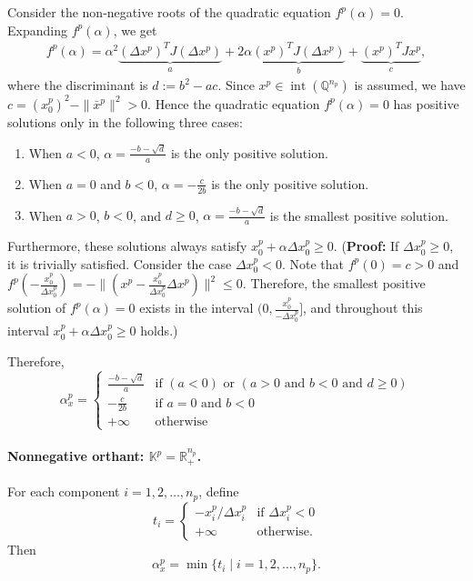 Consider the non-negative roots of the quadratic equation $f^p(\alpha)=0$. 
Expanding $f^p(\alpha)$, we get 
\begin{align*}
    f^p(\alpha) = \alpha^2\underbrace{(\Delta x^p)^T J (\Delta x^p)}_a + 2 \alpha \underbrace{(x^p)^T J (\Delta x^p)}_b + \underbrace{(x^p)^T J x^p}_c,
\end{align*}
where the discriminant is $d:=b^2-ac$.
Since $x^p\in \operatorname{int}(\mathbb{Q}^{n_p})$ is assumed, we have $c = (x^p_0)^2 - \|\bar{x}^p\|^2 > 0$.
Hence the quadratic equation $f^p(\alpha) = 0$ has positive solutions only in the following three cases:
\begin{enumerate}
    \item When $a<0$, $\alpha=\frac{-b-\sqrt{d}}{a}$ is the only positive solution.
    \item When $a=0$ and $b<0$, $\alpha=-\frac{c}{2b}$ is the only positive solution.
    \item When $a>0$, $b<0$, and $d\geq 0$, $\alpha=\frac{-b-\sqrt{d}}{a}$ is the smallest positive solution.
\end{enumerate}
Furthermore, these solutions always satisfy $x^p_0+\alpha \Delta x^p_0\geq 0$.
(\textbf{Proof:} If $\Delta x^p_0 \geq 0$, it is trivially satisfied. 
Consider the case $\Delta x^p_0 < 0$. 
Note that $f^p(0)=c>0$ and $f^p(-\frac{x^p_0}{\Delta x^p_0}) = - \|(x^p -\frac{x^p_0}{\Delta x^p_0} \Delta x^p)\|^2 \leq 0$.
Therefore, the smallest positive solution of $f^p(\alpha) = 0$ exists in the interval $\big(0, \frac{x^p_0}{-\Delta x^p_0}\big]$, 
and throughout this interval $x^p_0+\alpha \Delta x^p_0\geq 0$ holds.)

Therefore,
\begin{equation*}
    \alpha^p_x=\begin{cases}
       \frac{-b - \sqrt{d}}{a} & \text{if } (a < 0) \text{ or } (a > 0 \text{ and } b < 0 \text{ and } d \geq 0)\\
       -\frac{c}{2b} & \text{if } a=0 \text{ and } b<0\\
       +\infty & \text{otherwise}
    \end{cases}
\end{equation*}

\paragraph{Nonnegative orthant: $\mathbb{K}^p = \mathbb{R}^{n_p}_+$.}
For each component $i=1,2,\ldots,n_p$, define
\[
t_i= \begin{cases}
    -x^p_i / \Delta x^p_i & \text{if } \Delta x^p_i < 0 \\
    +\infty & \text{otherwise}.
\end{cases}
\]
Then
\[
    \alpha^p_x = \min\{t_i \mid i=1,2,\ldots,n_p\}.
\]

